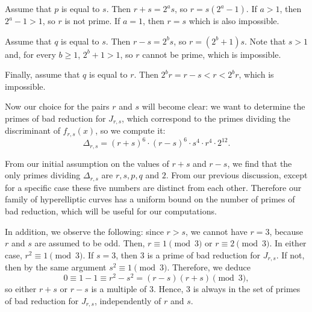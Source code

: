 \documentclass[a4paper, 12pt]{amsart}
\theoremstyle{definition}
\theoremstyle{plain}
\theoremstyle{plain}
\theoremstyle{plain}
\theoremstyle{plain}
\theoremstyle{remark}
\theoremstyle{remark}
\theoremstyle{plain}
\begin{document}
	Assume that $p$ is equal to $s$. Then $r+s=2^as$, so $r=s(2^a-1)$. If $a>1$, then $2^a-1>1$, so $r$ is not prime. If $a=1$, then $r=s$ which is also impossible.
	
	Assume that $q$ is equal to $s$. Then $r-s=2^bs$, so $r=(2^b+1)s$. Note that $s>1$ and, for every $b\ge 1$, $2^b+1>1$, so $r$ cannot be prime, which is impossible.
	
	Finally, assume that $q$ is equal to $r$. Then $2^br=r-s<r<2^br$, which is impossible.
	
	
	Now our choice for the pairs $r$ and $s$ will become clear: we want to determine the primes of bad reduction for $J_{r,s}$, which correspond to the primes dividing the discriminant of $f_{r,s}(x)$, so we compute it:
	\begin{equation*}
		\Delta_{r,s}=(r+s)^6\cdot(r-s)^6\cdot s^4\cdot r^4\cdot 2^{12}.
	\end{equation*}
	
	From our initial assumption on the values of $r+s$ and $r-s$, we find that the only primes dividing $\Delta_{r,s}$ are $r,s,p,q$ and $2$. From our previous discussion, except for a specific case these five numbers are distinct from each other. Therefore our family of hyperelliptic curves has a uniform bound on the number of primes of bad reduction, which will be useful for our computations.
	
	In addition, we observe the following: since $r>s$, we cannot have $r=3$, because $r$ and $s$ are assumed to be odd. Then, $r\equiv 1\pmod{3}$ or $r\equiv 2\pmod{3}$. In either case, $r^2\equiv 1\pmod{3}$. If $s=3$, then 3 is a prime of bad reduction for $J_{r,s}$. If not, then by the same argument $s^2\equiv 1\pmod{3}$. Therefore, we deduce
	\begin{equation*}
		0\equiv 1-1\equiv r^2-s^2=(r-s)(r+s)\pmod{3},
	\end{equation*}
	so either $r+s$ or $r-s$ is a multiple of $3$. Hence, 3 is always in the set of primes of bad reduction for $J_{r,s}$, independently of $r$ and $s$.
	
\end{document}
